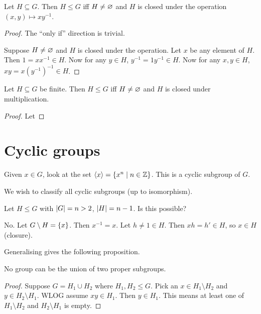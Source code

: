 \begin{proposition}
    Let $H \subseteq G$.
    Then $H \le G$ iff $H \ne \varnothing$ and $H$ is closed under the operation
    $(x, y) \mapsto xy^{-1}$.
\end{proposition}
\begin{proof}
    The ``only if'' direction is trivial.

    Suppose $H \ne \varnothing$ and $H$ is closed under the operation.
    Let $x$ be any element of $H$.
    Then $1 = xx^{-1} \in H$.
    Now for any $y \in H$, $y^{-1} = 1y^{-1} \in H$.
    Now for any $x, y \in H$, $xy = x(y^{-1})^{-1} \in H$.
\end{proof}

\begin{proposition}
    Let $H \subseteq G$ be finite.
    Then $H \le G$ iff $H \ne \varnothing$ and $H$ is closed under multiplication.
\end{proposition}
\begin{proof}
    Let
\end{proof}

\section{Cyclic groups} \label{sec:group:cyclic}
Given $x \in G$, look at the set $\langle x\rangle = \{x^n \mid n \in \mathbb{Z}\}$.
This is a cyclic subgroup of $G$.

We wish to classify all cyclic subgroups (up to isomorphism).

\begin{example}
    Let $H \le G$ with $\lvert G\rvert = n > 2$, $\lvert H\rvert = n-1$.
    Is this possible?

    No. Let $G \setminus H = \{x\}$.
    Then $x^{-1} = x$.
    Let $h \ne 1 \in H$.
    Then $xh = h' \in H$, so $x \in H$ (closure).
\end{example}

Generalising gives the following proposition.
\begin{proposition}
    No group can be the union of two proper subgroups.
\end{proposition}
\begin{proof}
    Suppose $G = H_1 \cup H_2$ where $H_1, H_2 \le G$.
    Pick an $x \in H_1 \setminus H_2$ and $y \in H_2 \setminus H_1$.
    WLOG assume $xy \in H_1$.
    Then $y \in H_1$.
    This means at least one of $H_1 \setminus H_2$ and $H_2 \setminus H_1$
    is empty.
\end{proof}

